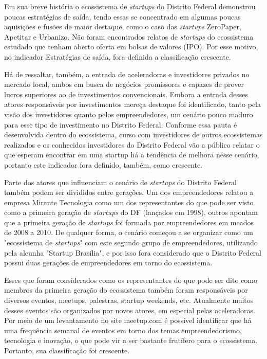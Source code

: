 Em sua breve história o ecossistema de \textit{startups} do Distrito Federal demonstrou poucas estratégias de saída, tendo essas se concentrado em algumas poucas aquisições e fusões de maior destaque, como o caso das \textit{startups} ZeroPaper, Apetitar e Urbanizo. Não foram encontrados relatos de \textit{startups} do ecossistema estudado que tenham aberto oferta em bolsas de valores (IPO). Por esse motivo, no indicador Estratégias de saída, fora definida a classificação crescente. 

Há de ressaltar, também, a entrada de aceleradoras e investidores privados no mercado local, ambos em busca de negócios promissores e capazes de prover lucros superiores ao de investimentos convencionais. Embora a entrada desses atores responsáveis por investimentos mereça destaque foi identificado, tanto pela visão dos investidores quanto pelos empreendedores, um cenário pouco maduro para esse tipo de investimento no Distrito Federal. Conforme essa pauta é desenvolvida dentro do ecossistema, curso com investidores de outros ecossistemas realizados e os conhecidos investidores do Distrito Federal vão a público relatar o que esperam encontrar em uma startup há a tendência de melhora nesse cenário, portanto este indicador fora definido, também, como crescente.

Parte dos atores que influenciam o cenário de \textit{startups} do Distrito Federal também podem ser divididos entre gerações. Um dos empreendedores relatou a empresa Mirante Tecnologia como um dos representantes do que pode ser visto como a primeira geração de \textit{startups} do DF (lançados em 1998), outros apontam que a primeira geração de \textit{startups} foi formada por empreendedores em meados de 2008 a 2010. De qualquer forma, o cenário começou a se organizar como um "ecossistema de \textit{startups}" com este segundo grupo de empreendedores, utilizando pela alcunha "Startup Brasília", e por isso fora considerado que o Distrito Federal possui duas gerações de empreendedores em torno do ecossistema.

Esses que foram considerados como os representantes do que pode ser dito como membros da primeira geração do ecossistema também foram responsáveis por diversos eventos, meetups, palestras, startup weekends, etc. Atualmente muitos desses eventos são organizados por novos atores, em especial pelas aceleradoras. Por meio de um levantamento no site meetup.com é possível identificar que há uma frequência semanal de eventos em torno dos temas empreendedorismo, tecnologia e inovação, o que pode vir a ser bastante frutífero para o ecossistema. Portanto, sua classificação foi crescente.

